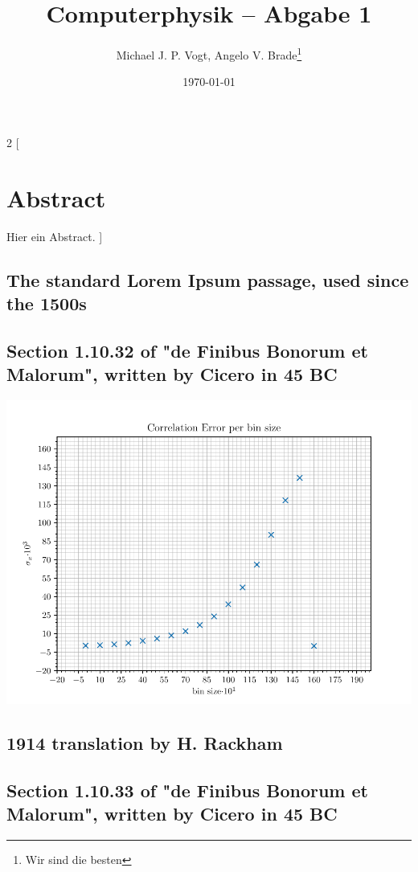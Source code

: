 \documentclass[10pt]{article}
\title{Computerphysik -- Abgabe 1}
\author{Michael J. P. Vogt, Angelo V. Brade\thanks{Wir sind die besten}}
\date{\today}
\newenvironment{Figure}
  {\par\medskip\noindent\minipage{\linewidth}}
  {\endminipage\par\medskip}
\begin{document}
\maketitle
\tableofcontents

\begin{multicols}{2}
[
    \section{Abstract}
    Hier ein Abstract.
]
\subsection{The standard Lorem Ipsum passage, used since the 1500s}
\lipsum[1]

\lipsum[6]

\subsection{Section 1.10.32 of "de Finibus Bonorum et Malorum", written by Cicero in 45 BC}
\lipsum[2]
\begin{Figure}
    \centering
    \includegraphics[width=1.0\linewidth]{CorrelationErrorPerBinSize}
\end{Figure}
\lipsum[3]

\subsection{1914 translation by H. Rackham}
\lipsum[4]

\subsection{Section 1.10.33 of "de Finibus Bonorum et Malorum", written by Cicero in 45 BC}
\lipsum[5]


\end{multicols}
\end{document}
